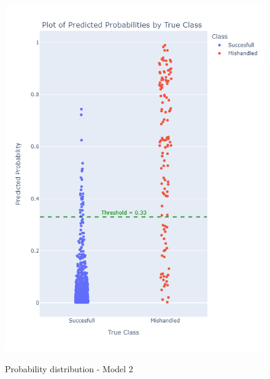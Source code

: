 \documentclass[12pt]{article}
\begin{document}
\FloatBarrier
\begin{figure}
\begin{minipage}[c]{0.4\linewidth}
    \includegraphics[width=1\textwidth]{Probability_distribution_Model 2.png}\\
    \caption{Probability distribution - Model 2}
\end{minipage}%
\hfill
\begin{minipage}[c]{0.4\linewidth}

\end{minipage}
\end{figure}
\end{document}
